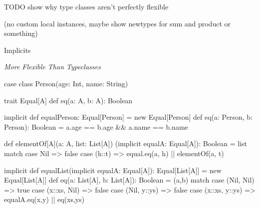 \documentclass[usenames,dvipsnames,svgnames,table,aspectratio=169,mathserif]{beamer}
\newcommand{\nl}{\vspace{\baselineskip}}
\newcommand{\pnl}{\pause \nl}
\begin{document}
\begin{frame}
TODO show why type classes aren't perfectly flexible

(no custom local instances, maybe show newtypes for sum and product or something)
\end{frame}



\begin{frame}
\begin{center}
\Huge{Implicits}

\nl

\large{{\it More Flexible Than Typeclasses}\texttrademark}
\end{center}
\end{frame}


\begin{frame}[fragile]
\begin{scalacode}
case class Person(age: Int, name: String)
\end{scalacode}

\pnl

\begin{scalacode}
trait Equal[A] {
  def eq(a: A, b: A): Boolean
}
\end{scalacode}

\pnl

\begin{scalacode}
implicit def equalPerson: Equal[Person] = new Equal[Person] {
  def eq(a: Person, b: Person): Boolean =
    a.age == b.age && a.name == b.name
}
\end{scalacode}
\end{frame}


\begin{frame}[fragile]
\begin{scalacode}
def elementOf[A](a: A, list: List[A])
                (implicit equalA: Equal[A]): Boolean = {
  list match {
    case Nil => false
    case (h::t) => equal.eq(a, h) || elementOf(a, t)
  }
}
\end{scalacode}
\end{frame}


\begin{frame}[fragile]
\begin{scalacode}
implicit def equalList(implicit equalA: Equal[A]): Equal[List[A]] =
  new Equal[List[A]] {
    def eq(a: List[A], b: List[A]): Boolean = {
      (a,b) match {
        case (Nil,   Nil)   => true
        case (x::xs, Nil)   => false
        case (Nil,   y::ys) => false
        case (x::xs, y::ys) => equalA.eq(x,y) || eq(xs,ys)
      }
    }
  }
\end{scalacode}
\end{frame}
\end{document}
